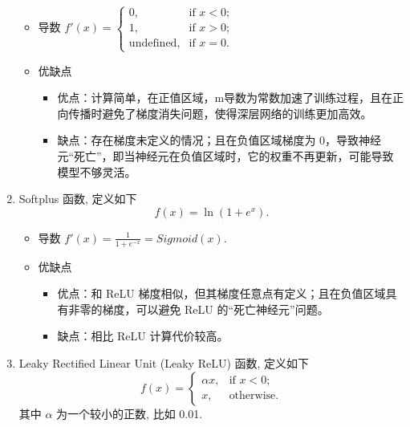 \documentclass[8pt]{article}
\begin{document}
\begin{enumerate}
    \begin{itemize}
        \item 导数 $f'(x) = \begin{cases}
            0, & \text{if } x < 0; \\
            1, & \text{if } x > 0; \\
            \text{undefined}, & \text{if } x = 0.
        \end{cases}$
        \item 优缺点
        \begin{itemize}
            \item 优点：计算简单，在正值区域，m导数为常数加速了训练过程，且在正向传播时避免了梯度消失问题，使得深层网络的训练更加高效。
            \item 缺点：存在梯度未定义的情况；且在负值区域梯度为 0，导致神经元“死亡”，即当神经元在负值区域时，它的权重不再更新，可能导致模型不够灵活。
        \end{itemize}
    \end{itemize}

    \item Softplus 函数, 定义如下
    \begin{equation}
        f(x) = \ln(1 + e^x).
        \label{eq:softplus}
    \end{equation}

    \begin{itemize}
        \item 导数 $f'(x) = \frac{1}{1 + e^{-x}} = Sigmoid(x)$.
        \item 优缺点
        \begin{itemize}
            \item 优点：和 ReLU 梯度相似，但其梯度任意点有定义；且在负值区域具有非零的梯度，可以避免 ReLU 的“死亡神经元”问题。
            \item 缺点：相比 ReLU 计算代价较高。
        \end{itemize}
    \end{itemize}

    \item Leaky Rectified Linear Unit (Leaky ReLU) 函数, 定义如下
    \begin{equation}
        f(x) = \begin{cases}
            \alpha x, & \text{if } x < 0; \\
            x, & \text{otherwise}.
        \end{cases}
        \label{eq:leaky_relu}
    \end{equation}
    其中 $\alpha$ 为一个较小的正数, 比如 0.01.


\end{enumerate}
\end{document}
